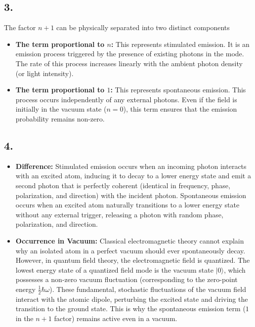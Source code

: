 \documentclass[11pt,a4paper]{article}
\begin{document}
\subsection*{3.}
The factor $n+1$ can be physically separated into two distinct components
\begin{itemize}
    \item \textbf{The term proportional to $n$:} This represents stimulated emission. It is an emission process triggered by the presence of existing photons in the mode. The rate of this process increases linearly with the ambient photon density (or light intensity).
    \item \textbf{The term proportional to $1$:} This represents spontaneous emission. This process occurs independently of any external photons. Even if the field is initially in the vacuum state ($n=0$), this term ensures that the emission probability remains non-zero.
\end{itemize}

\subsection*{4.}
\begin{itemize}
    \item \textbf{Difference:} Stimulated emission occurs when an incoming photon interacts with an excited atom, inducing it to decay to a lower energy state and emit a second photon that is perfectly coherent (identical in frequency, phase, polarization, and direction) with the incident photon. Spontaneous emission occurs when an excited atom naturally transitions to a lower energy state without any external trigger, releasing a photon with random phase, polarization, and direction.
    \item \textbf{Occurrence in Vacuum:} Classical electromagnetic theory cannot explain why an isolated atom in a perfect vacuum should ever spontaneously decay. However, in quantum field theory, the electromagnetic field is quantized. The lowest energy state of a quantized field mode is the vacuum state $|0\rangle$, which possesses a non-zero vacuum fluctuation (corresponding to the zero-point energy $\frac{1}{2}\hbar\omega$). These fundamental, stochastic fluctuations of the vacuum field interact with the atomic dipole, perturbing the excited state and driving the transition to the ground state. This is why the spontaneous emission term ($1$ in the $n+1$ factor) remains active even in a vacuum.
\end{itemize}
\end{document}
